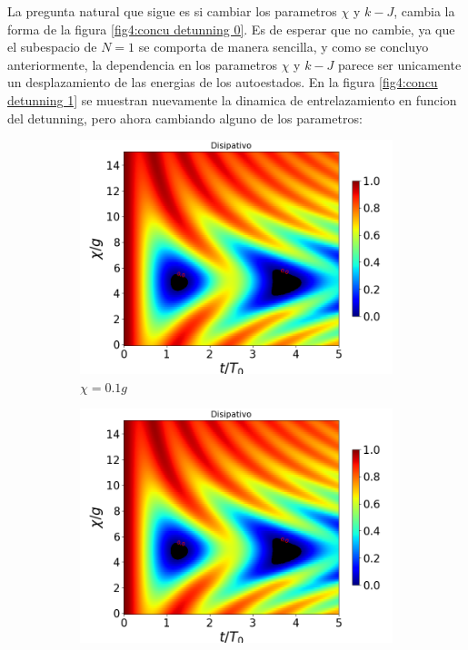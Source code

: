 La pregunta natural que sigue es si cambiar los parametros $\chi$ y $k-J$, cambia la forma de la figura \ref{fig4:concu detunning 0}. Es de esperar que no cambie, ya que el subespacio de $N=1$ se comporta de manera sencilla, y como se concluyo anteriormente, la dependencia en los parametros $\chi$ y $k-J$ parece ser unicamente un desplazamiento de las energias de los autoestados. En la figura \ref{fig4:concu detunning 1} se muestran nuevamente la dinamica de entrelazamiento en funcion del detunning, pero ahora cambiando alguno de los parametros:

\begin{figure}[h]
    \centering
    \begin{subfigure}{0.49\textwidth}
        \includegraphics[width=\textwidth]{figuras/ch4/concu/chi/eg0+ge0 d=5.0g k=0.0g J=0.0g gamma=0.25g concu chi dis.png}
        \caption{$\chi=0.1g$}
        \label{fig4:concu x d1}
    \end{subfigure}
    \hfill
    \begin{subfigure}{0.49\textwidth}
        \includegraphics[width=\textwidth]{figuras/ch4/concu/chi/eg0+ge0 d=5.0g k=0.0g J=0.0g gamma=0.25g concu chi dis.png}

\end{subfigure}
\end{figure}
